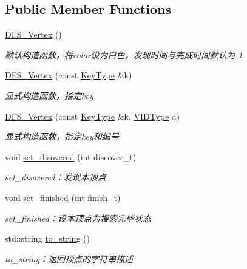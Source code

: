 \subsection*{Public Member Functions}
\begin{DoxyCompactItemize}
\item 
\hyperlink{struct_introduction_to_algorithm_1_1_graph_algorithm_1_1_d_f_s___vertex_a91c4d3427c469cbb16459f6a34ac1307}{D\+F\+S\+\_\+\+Vertex} ()
\begin{DoxyCompactList}\small\item\em 默认构造函数，将{\ttfamily color}设为白色，发现时间与完成时间默认为-\/1 \end{DoxyCompactList}\item 
\hyperlink{struct_introduction_to_algorithm_1_1_graph_algorithm_1_1_d_f_s___vertex_a2b44ef3bada5ce96e84fbd5e6b8c0e56}{D\+F\+S\+\_\+\+Vertex} (const \hyperlink{struct_introduction_to_algorithm_1_1_graph_algorithm_1_1_d_f_s___vertex_ab53cda3a7d135ed892b298c14d5579fe}{Key\+Type} \&k)
\begin{DoxyCompactList}\small\item\em 显式构造函数，指定{\ttfamily key} \end{DoxyCompactList}\item 
\hyperlink{struct_introduction_to_algorithm_1_1_graph_algorithm_1_1_d_f_s___vertex_adbee712bffa03e88e3624a144528fe54}{D\+F\+S\+\_\+\+Vertex} (const \hyperlink{struct_introduction_to_algorithm_1_1_graph_algorithm_1_1_d_f_s___vertex_ab53cda3a7d135ed892b298c14d5579fe}{Key\+Type} \&k, \hyperlink{struct_introduction_to_algorithm_1_1_graph_algorithm_1_1_d_f_s___vertex_aeb115a10366eb62880d2672d4e1da7a1}{V\+I\+D\+Type} d)
\begin{DoxyCompactList}\small\item\em 显式构造函数，指定{\ttfamily key}和编号 \end{DoxyCompactList}\item 
void \hyperlink{struct_introduction_to_algorithm_1_1_graph_algorithm_1_1_d_f_s___vertex_ab1969489b2a5d73191da5664b127226d}{set\+\_\+disovered} (int discover\+\_\+t)
\begin{DoxyCompactList}\small\item\em set\+\_\+disovered：发现本顶点 \end{DoxyCompactList}\item 
void \hyperlink{struct_introduction_to_algorithm_1_1_graph_algorithm_1_1_d_f_s___vertex_a07353127c56aabb5c411ca7f4d28c553}{set\+\_\+finished} (int finish\+\_\+t)
\begin{DoxyCompactList}\small\item\em set\+\_\+finished：设本顶点为搜索完毕状态 \end{DoxyCompactList}\item 
std\+::string \hyperlink{struct_introduction_to_algorithm_1_1_graph_algorithm_1_1_d_f_s___vertex_a9a8a8c8b2ad1c3b6e90d2c2efb7cbe2e}{to\+\_\+string} ()
\begin{DoxyCompactList}\small\item\em to\+\_\+string：返回顶点的字符串描述 \end{DoxyCompactList}\end{DoxyCompactItemize}
